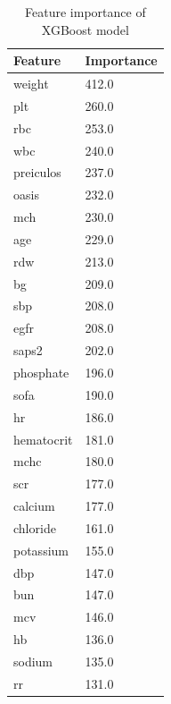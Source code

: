 \documentclass[../main.tex]{subfiles}
\begin{document}
\begin{table}
    \centering
    \begin{tabular}{|l|l|}
        \hline
        \textbf{Feature} & \textbf{Importance} \\ \hline\hline
        weight & 412.0 \\ \hline
        plt & 260.0 \\ \hline
        rbc & 253.0 \\ \hline
        wbc & 240.0 \\ \hline
        preiculos & 237.0 \\ \hline
        oasis & 232.0 \\ \hline
        mch & 230.0 \\ \hline
        age & 229.0 \\ \hline
        rdw & 213.0 \\ \hline
        bg & 209.0 \\ \hline
        sbp & 208.0 \\ \hline
        egfr & 208.0 \\ \hline
        saps2 & 202.0 \\ \hline
        phosphate & 196.0 \\ \hline
        sofa & 190.0 \\ \hline
        hr & 186.0 \\ \hline
        hematocrit & 181.0 \\ \hline
        mchc & 180.0 \\ \hline
        scr & 177.0 \\ \hline
        calcium & 177.0 \\ \hline
        chloride & 161.0 \\ \hline
        potassium & 155.0 \\ \hline
        dbp & 147.0 \\ \hline
        bun & 147.0 \\ \hline
        mcv & 146.0 \\ \hline
        hb & 136.0 \\ \hline
        sodium & 135.0 \\ \hline
        rr & 131.0 \\ \hline
    \end{tabular}
    \caption{Feature importance of XGBoost model}
    \label{tab:xgboost-feature-importance}
\end{table}
\end{document}
